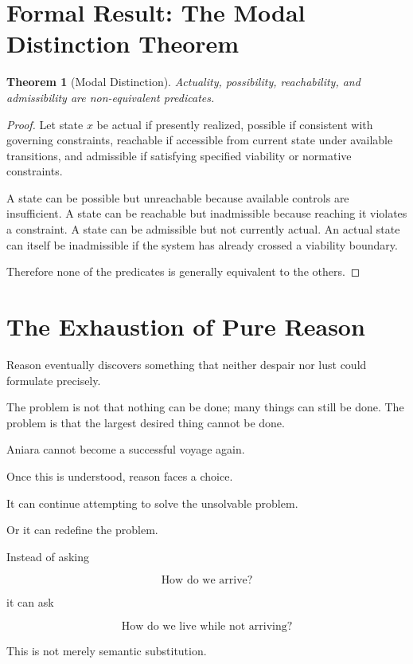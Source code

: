 \documentclass[11pt,oneside]{book}
\newtheorem{theorem}{Theorem}[chapter]
\theoremstyle{definition}
\theoremstyle{remark}
\begin{document}
\section{Formal Result: The Modal Distinction Theorem}

\begin{theorem}[Modal Distinction]
Actuality, possibility, reachability, and admissibility are non-equivalent predicates.
\end{theorem}

\begin{proof}
Let state \(x\) be actual if presently realized, possible if consistent with governing constraints, reachable if accessible from current state under available transitions, and admissible if satisfying specified viability or normative constraints.

A state can be possible but unreachable because available controls are insufficient. A state can be reachable but inadmissible because reaching it violates a constraint. A state can be admissible but not currently actual. An actual state can itself be inadmissible if the system has already crossed a viability boundary.

Therefore none of the predicates is generally equivalent to the others.
\end{proof}

\section{The Exhaustion of Pure Reason}

Reason eventually discovers something that neither despair nor lust could formulate precisely.

The problem is not that nothing can be done; many things can still be done. The problem is that the largest desired thing cannot be done.

Aniara cannot become a successful voyage again.

Once this is understood, reason faces a choice.

It can continue attempting to solve the unsolvable problem.

Or it can redefine the problem.

Instead of asking

\[
\text{How do we arrive?}
\]

it can ask

\[
\text{How do we live while not arriving?}
\]

This is not merely semantic substitution.
\end{document}
